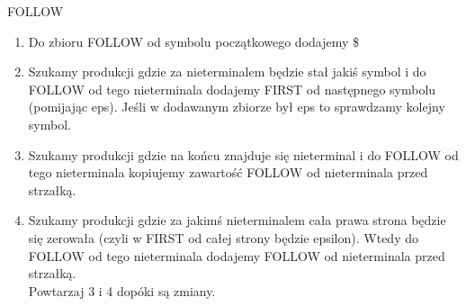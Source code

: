 FOLLOW
\begin{enumerate}
  \item Do zbioru FOLLOW od symbolu początkowego dodajemy \$
  \item  Szukamy produkcji gdzie za nieterminalem będzie stał jakiś symbol i do FOLLOW od tego nieterminala dodajemy FIRST od następnego symbolu (pomijając eps). Jeśli w dodawanym zbiorze był eps to sprawdzamy kolejny symbol.
  \item Szukamy produkcji gdzie na końcu znajduje się nieterminal i do FOLLOW od tego nieterminala kopiujemy zawartość FOLLOW od nieterminala przed strzałką. 
  \item Szukamy produkcji gdzie za jakimś nieterminalem cała prawa strona będzie się zerowała (czyli w FIRST od całej strony będzie epsilon). Wtedy do FOLLOW od tego nieterminala dodajemy FOLLOW od nieterminala przed strzałką. \\
  Powtarzaj 3 i 4 dopóki są zmiany.
\end{enumerate}
